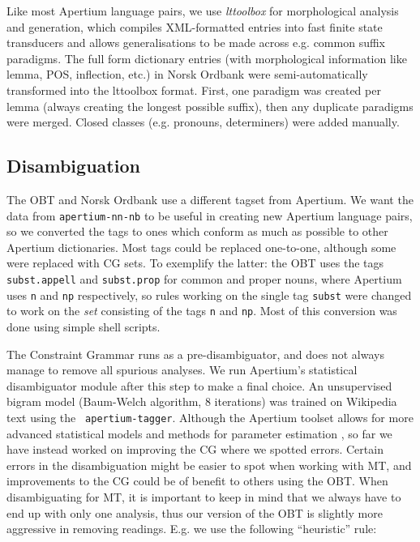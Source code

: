 \documentclass[11pt]{article}
\begin{document}
Like most Apertium language pairs, we use \emph{lttoolbox} for
morphological analysis and generation, which compiles XML-formatted
entries into fast finite state transducers and allows generalisations
to be made across e.g. common suffix paradigms. The full form
dictionary entries (with morphological information like lemma, POS,
inflection, etc.) in Norsk Ordbank were semi-automatically transformed
into the lttoolbox format. First, one paradigm was created per lemma
(always creating the longest possible suffix), then any duplicate
paradigms were merged. Closed classes (e.g. pronouns, determiners) were
added manually.

\subsection{Disambiguation}

The OBT and Norsk Ordbank use a different tagset from Apertium. We
want the data from {\tt \small apertium-nn-nb} to be useful in
creating new Apertium language pairs, so we converted the tags to ones
which conform as much as possible to other Apertium dictionaries. Most
tags could be replaced one-to-one, although some were replaced with CG
sets. To exemplify the latter: the OBT uses the tags {\tt \small
  subst.appell} and {\tt \small subst.prop} for common and proper
nouns, where Apertium uses {\tt \small n} and {\tt \small np}
respectively, so rules working on the single tag {\tt \small subst}
were changed to work on the \emph{set} consisting of the tags {\tt \small n}
and {\tt \small np}. Most of this conversion was done using simple
shell scripts.

The Constraint Grammar runs as a pre-disambiguator, and does not
always manage to remove all spurious analyses. We run Apertium's
statistical disambiguator module after this step to make a final
choice. An unsupervised bigram model (Baum-Welch algorithm, 8
iterations) was trained on Wikipedia text using the {\tt \small
  apertium-tagger}. Although the Apertium toolset allows for more
advanced statistical models \citep{sheikh2009trigram} and methods for
parameter estimation \citep{sanchez2008utl}, so far we have instead
worked on improving the CG where we spotted errors. Certain errors in
the disambiguation might be easier to spot when working with MT, and
improvements to the CG could be of benefit to others using the
OBT. When disambiguating for MT, it is important to keep in mind that
we always have to end up with only one analysis, thus our version of
the OBT is slightly more aggressive in removing readings. E.g. we use
the following ``heuristic'' rule:
\end{document}
